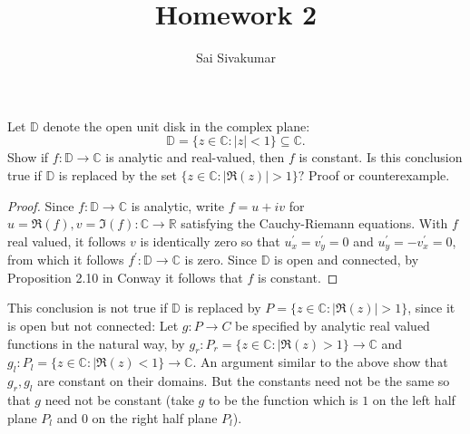 \documentclass[12pt]{amsart}
\title{Homework 2}
\author{Sai Sivakumar}
\newcommand{\CC}{\mathbb{C}}
\newcommand{\DD}{\mathbb{D}}
\begin{document}
\maketitle

\thispagestyle{empty}
 Let $\DD$ denote the open unit disk in the complex plane:
\[
 \DD=\{z\in\CC: |z|<1\} \subseteq \CC.
\]
 Show if  $f:\DD\to\CC$  is analytic and real-valued,
 then $f$ is constant. Is this conclusion true 
 if $\DD$ is replaced by the set $\{z\in \CC: |\Re(z)|>1\}?$
 Proof or counterexample.

\bigskip

\begin{proof}
\baselineskip=24pt
Since $f\colon\mathbb{D}\to\mathbb{C}$ is analytic, write $f = u+iv$ for $u = \Re(f) ,v = \Im(f) \colon\mathbb{C}\to \mathbb{R}$ satisfying the Cauchy-Riemann equations. With $f$ real valued, it follows $v$ is identically zero so that $u^\prime_x = v^\prime_y = 0$ and $u^\prime_y = -v^\prime_x = 0$, from which it follows $f^\prime\colon \mathbb{D}\to \mathbb{C}$ is zero. Since $\mathbb{D}$ is open and connected, by Proposition 2.10 in Conway it follows that $f$ is constant.
\end{proof}

This conclusion is not true if $\mathbb{D}$ is replaced by $P = \{z\in \CC: |\Re(z)|>1\}$, since it is open but not connected: Let $g\colon P\to C$ be specified by analytic real valued functions in the natural way, by $g_r\colon P_r = \{z\in \CC: |\Re(z)>1\}\to \mathbb{C}$ and $g_l\colon P_l = \{z\in \CC: |\Re(z)<1\}\to \mathbb{C}$. An argument similar to the above show that $g_r,g_l$ are constant on their domains. But the constants need not be the same so that $g$ need not be constant (take $g$ to be the function which is $1$ on the left half plane $P_l$ and $0$ on the right half plane $P_l$).
\end{document}
